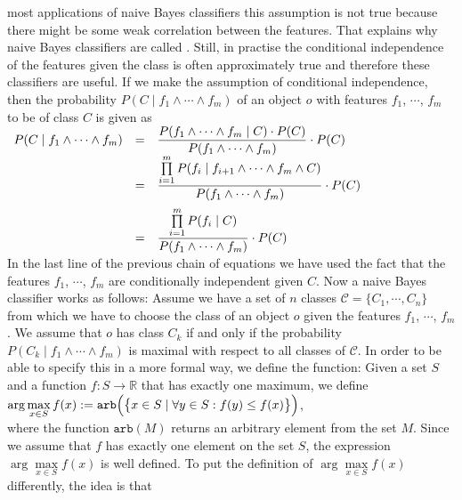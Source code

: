 most applications of naive Bayes classifiers this assumption is not true because there might be some weak
correlation between the features.  That explains why naive Bayes classifiers are called .  Still,
in practise the conditional independence of the features given 
the class is often approximately true and therefore these classifiers are useful.  If we make the
assumption of conditional independence, then the probability $P(C\;|\; f_1 \wedge \cdots \wedge f_m)$ of an
object $o$ with features $f_1$, $\cdots$, $f_m$ to be of class $C$ is given as
\\[0.2cm]
\hspace*{1.3cm}
$
\begin{array}[t]{lcll}
      P(C\;|\; f_1 \wedge \cdots \wedge f_m) 
& = & \displaystyle \frac{P(f_1 \wedge \cdots \wedge f_m \;|\; C) \cdot P(C)}{P(f_1 \wedge \cdots \wedge f_m)} \cdot P(C) \\[0.2cm]
& = & \displaystyle \frac{\prod\limits_{i=1}^m P(f_i \;|\; f_{i+1} \wedge \cdots \wedge f_m \wedge C)}{P(f_1 \wedge \cdots \wedge f_m)} \cdot P(C) \\[0.4cm]
& = & \displaystyle \frac{\prod\limits_{i=1}^m P(f_i \;|\; C)}{P(f_1 \wedge \cdots \wedge f_m)} \cdot P(C) 
\end{array}
$
\\[0.2cm]
In the last line of the previous chain of equations we have used the fact that the features $f_1$, $\cdots$,
$f_m$ are conditionally independent given $C$.  Now a naive Bayes classifier works as follows: 
Assume we have a set of $n$ classes $\mathcal{C} = \{ C_1, \cdots, C_n \}$ from which we have to choose the
class of an object $o$ given the features  $f_1$, $\cdots$, $f_m$.  We assume that $o$ has class $C_k$ if
and only if the probability $P(C_k\;|\; f_1 \wedge \cdots \wedge f_m)$ is maximal with respect to all classes
of $\mathcal{C}$.  In order to be able to specify this in a more formal
way, we define the \blue{$\arg\max$} function: Given a set $S$ and a function $f:S \rightarrow \mathbb{R}$ that has
exactly one maximum, we define
\\[0.2cm]
\hspace*{1.3cm}
$\arg\max\limits_{x \in S} f(x) := \texttt{arb}\Bigl(\bigl\{ x \in S \mid \forall y \in S: f(y) \leq f(x)\bigr\}\Bigr)$,
\\[0.2cm]
where the function $\texttt{arb}(M)$ returns an arbitrary element from the set $M$. 
Since we assume that $f$ has exactly one element on the set $S$, the expression 
$\arg\max\limits_{x \in S} f(x)$ is well defined.  To
put the definition of  $\arg\max\limits_{x \in S} f(x)$ differently, the idea is that
